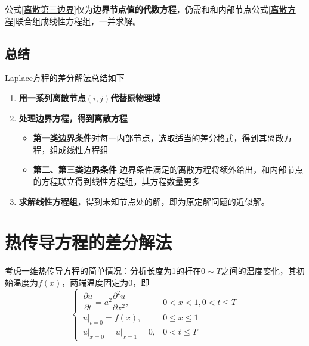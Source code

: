 公式\eqref{离散第三边界}仅为\textbf{边界节点值的代数方程}，仍需和和内部节点公式\eqref{离散方程}联合组成线性方程组，一并求解。
\vspace*{1em}

\subsection{总结}
 Laplace方程的差分解法总结如下
\begin{enumerate}
	\item \textbf{用一系列离散节点$(i,j)$代替原物理域}
	\item \textbf{处理边界方程，得到离散方程}
	\begin{itemize}
		\item \textbf{第一类边界条件}\quad 对每一内部节点，选取适当的差分格式，得到其离散方程，组成线性方程组
		\item \textbf{第二、第三类边界条件 }\quad 边界条件满足的离散方程将额外给出，和内部节点的方程联立得到线性方程组，其方程数量更多
	\end{itemize}
	\item \textbf{求解线性方程组}，得到未知节点处的解，即为原定解问题的近似解。
\end{enumerate}

\clearpage

\section{热传导方程的差分解法}
考虑一维热传导方程的简单情况：分析长度为1的杆在$0 \sim T$之间的温度变化，其初始温度为$f(x)$，两端温度固定为0，即
\begin{equation}
	\begin{cases}
		\, \dfrac{\partial u}{\partial t} = a^2 \dfrac{\partial^2 u}{\partial x^2}, & 0<x<1,0<t\le T\\[0.5em]
		\, u\big|_{t=0} = f(x), & 0 \le x \le 1\\
		\, u\big|_{x=0} = u\big|_{x=1} = 0, & 0 < t \le T
	\end{cases}
\end{equation}
\vspace*{0.5em}

